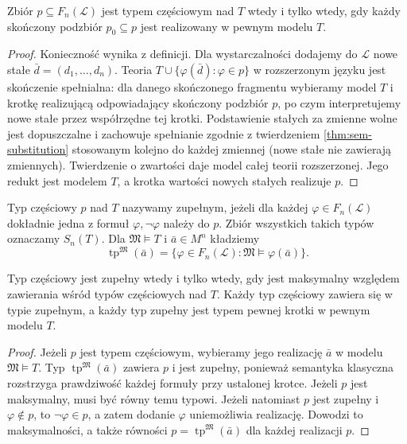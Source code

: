 \begin{lemat}
\label{lem:mod-type-compactness}
Zbiór $p\subseteq F_n(\mathcal L)$ jest typem częściowym nad $T$
wtedy i tylko wtedy, gdy każdy skończony podzbiór $p_0\subseteq p$
jest realizowany w pewnym modelu $T$.
\end{lemat}
\begin{proof}
Konieczność wynika z definicji. Dla wystarczalności dodajemy do
$\mathcal L$ nowe stałe $\bar d=(d_1,\ldots,d_n)$.
Teoria $T\cup\{\varphi(\bar d):\varphi\in p\}$ w rozszerzonym
języku jest skończenie spełnialna: dla danego skończonego
fragmentu wybieramy model $T$ i krotkę realizującą odpowiadający
skończony podzbiór $p$, po czym interpretujemy nowe stałe
przez współrzędne tej krotki. Podstawienie stałych za zmienne
wolne jest dopuszczalne i zachowuje spełnianie zgodnie
z twierdzeniem \ref{thm:sem-substitution} stosowanym kolejno
do każdej zmiennej (nowe stałe nie zawierają zmiennych).
Twierdzenie o zwartości daje model całej teorii rozszerzonej.
Jego redukt jest modelem $T$, a krotka wartości nowych
stałych realizuje $p$.
\end{proof}

\begin{definicja}
\label{def:mod-complete-type}
Typ częściowy $p$ nad $T$ nazywamy zupełnym, jeżeli dla każdej
$\varphi\in F_n(\mathcal L)$ dokładnie jedna z formuł
$\varphi,\neg\varphi$ należy do $p$.
Zbiór wszystkich takich typów oznaczamy $S_n(T)$.
Dla $\mathfrak M\models T$ i $\bar a\in M^n$ kładziemy
\[
\operatorname{tp}^{\mathfrak M}(\bar a)
=\{\varphi\in F_n(\mathcal L):\mathfrak M\models\varphi(\bar a)\}.
\]
\end{definicja}

\begin{twierdzenie}
\label{thm:mod-type-completion}
Typ częściowy jest zupełny wtedy i tylko wtedy, gdy jest
maksymalny względem zawierania wśród typów częściowych nad $T$.
Każdy typ częściowy zawiera się w typie zupełnym, a każdy
typ zupełny jest typem pewnej krotki w pewnym modelu $T$.
\end{twierdzenie}
\begin{proof}
Jeżeli $p$ jest typem częściowym, wybieramy jego realizację
$\bar a$ w modelu $\mathfrak M\models T$. Typ
$\operatorname{tp}^{\mathfrak M}(\bar a)$ zawiera $p$
i jest zupełny, ponieważ semantyka klasyczna rozstrzyga
prawdziwość każdej formuły przy ustalonej krotce.
Jeżeli $p$ jest maksymalny, musi być równy temu typowi.
Jeżeli natomiast $p$ jest zupełny i $\varphi\notin p$,
to $\neg\varphi\in p$, a zatem dodanie $\varphi$
uniemożliwia realizację. Dowodzi to maksymalności, a także
równości $p=\operatorname{tp}^{\mathfrak M}(\bar a)$ dla każdej
realizacji $p$.
\end{proof}


